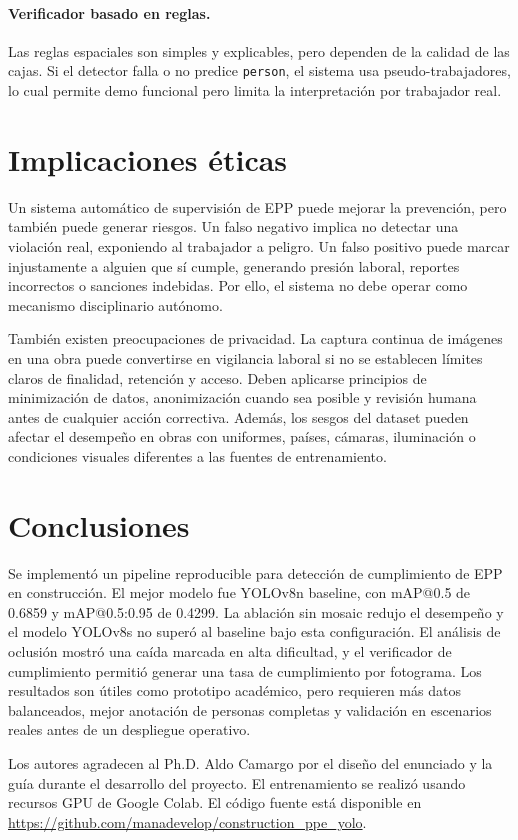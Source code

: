 \documentclass{article}
\begin{document}
\paragraph{Verificador basado en reglas.}
Las reglas espaciales son simples y explicables, pero dependen de la calidad de las cajas. Si el detector falla o no predice \texttt{person}, el sistema usa pseudo-trabajadores, lo cual permite demo funcional pero limita la interpretación por trabajador real.

\section{Implicaciones éticas}
Un sistema automático de supervisión de EPP puede mejorar la prevención, pero también puede generar riesgos. Un falso negativo implica no detectar una violación real, exponiendo al trabajador a peligro. Un falso positivo puede marcar injustamente a alguien que sí cumple, generando presión laboral, reportes incorrectos o sanciones indebidas. Por ello, el sistema no debe operar como mecanismo disciplinario autónomo.

También existen preocupaciones de privacidad. La captura continua de imágenes en una obra puede convertirse en vigilancia laboral si no se establecen límites claros de finalidad, retención y acceso. Deben aplicarse principios de minimización de datos, anonimización cuando sea posible y revisión humana antes de cualquier acción correctiva. Además, los sesgos del dataset pueden afectar el desempeño en obras con uniformes, países, cámaras, iluminación o condiciones visuales diferentes a las fuentes de entrenamiento.

\section{Conclusiones}
Se implementó un pipeline reproducible para detección de cumplimiento de EPP en construcción. El mejor modelo fue YOLOv8n baseline, con mAP@0.5 de 0.6859 y mAP@0.5:0.95 de 0.4299. La ablación sin mosaic redujo el desempeño y el modelo YOLOv8s no superó al baseline bajo esta configuración. El análisis de oclusión mostró una caída marcada en alta dificultad, y el verificador de cumplimiento permitió generar una tasa de cumplimiento por fotograma. Los resultados son útiles como prototipo académico, pero requieren más datos balanceados, mejor anotación de personas completas y validación en escenarios reales antes de un despliegue operativo.

\begin{ack}
Los autores agradecen al Ph.D. Aldo Camargo por el diseño del enunciado y la guía durante el desarrollo del proyecto. El entrenamiento se realizó usando recursos GPU de Google Colab. El código fuente está disponible en \url{https://github.com/manadevelop/construction_ppe_yolo}.
\end{ack}
\end{document}
